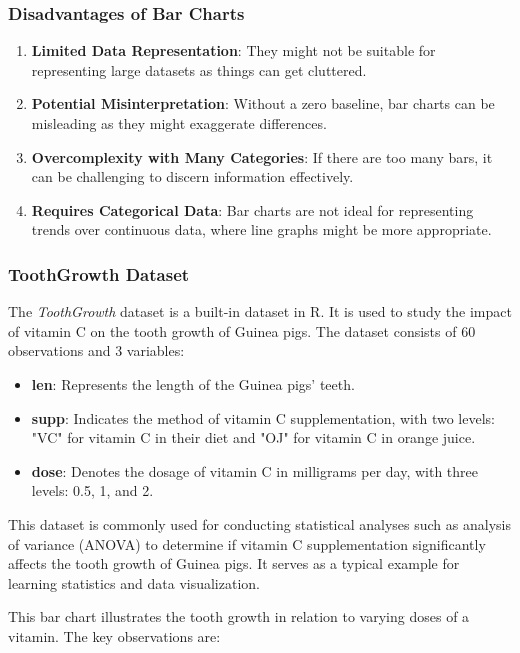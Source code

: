 \documentclass{article}\usepackage[]{graphicx}\usepackage[]{xcolor}
\begin{document}
\subsubsection{Disadvantages of Bar Charts}
\begin{enumerate}
    \item \textbf{Limited Data Representation}: They might not be suitable for representing large datasets as things can get cluttered.
    \item \textbf{Potential Misinterpretation}: Without a zero baseline, bar charts can be misleading as they might exaggerate differences.
    \item \textbf{Overcomplexity with Many Categories}: If there are too many bars, it can be challenging to discern information effectively.
    \item \textbf{Requires Categorical Data}: Bar charts are not ideal for representing trends over continuous data, where line graphs might be more appropriate.
\end{enumerate}
\subsubsection{ToothGrowth Dataset}

The \textit{ToothGrowth} dataset is a built-in dataset in R. It is used to study the impact of vitamin C on the tooth growth of Guinea pigs. The dataset consists of 60 observations and 3 variables:

\begin{itemize}
    \item \textbf{len}: Represents the length of the Guinea pigs' teeth.
    \item \textbf{supp}: Indicates the method of vitamin C supplementation, with two levels: "VC" for vitamin C in their diet and "OJ" for vitamin C in orange juice.
    \item \textbf{dose}: Denotes the dosage of vitamin C in milligrams per day, with three levels: 0.5, 1, and 2.
\end{itemize}

This dataset is commonly used for conducting statistical analyses such as analysis of variance (ANOVA) to determine if vitamin C supplementation significantly affects the tooth growth of Guinea pigs. It serves as a typical example for learning statistics and data visualization.

This bar chart illustrates the tooth growth in relation to varying doses of a vitamin. The key observations are:
\end{document}

